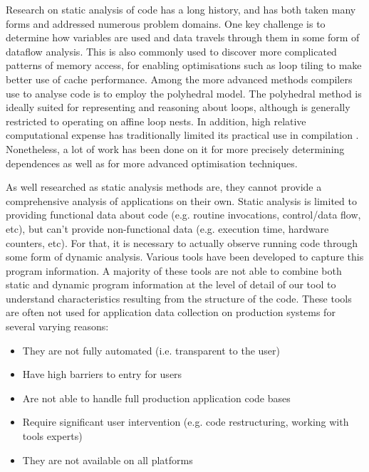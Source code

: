 Research on static analysis of code has a long history, and has both taken many forms and addressed numerous problem domains\cite{Andrade:2012:SAW:2355585.2355593}\cite{1194988}.
One key challenge is to determine how variables are used and data travels through them in some form of dataflow analysis\cite{Feautrier1991}.
This is also commonly used to discover more complicated patterns of memory access, for enabling optimisations such as loop tiling to make better use of cache performance.
Among the more advanced methods compilers use to analyse code is to employ the polyhedral model\cite{Cousot:1978:ADL:512760.512770}\cite{Bagnara:2009:APC:1628316.1628385}\cite{benabderrahmane.10.cc}.
The polyhedral method is ideally suited for representing and reasoning about loops, although is generally restricted to operating on affine loop nests. 
In addition, high relative computational expense has traditionally limited its practical use in compilation \cite{DBLP:journals/entcs/Simon10a}.
Nonetheless, a lot of work has been done on it for more precisely determining dependences \cite{Vasilache:2006:VDA:1183401.1183448} as well as for more advanced optimisation techniques\cite{Nieuwenhuizen2014AutovectorizationUP}\cite{5260526}.

As well researched as static analysis methods are, they cannot provide a comprehensive analysis of applications on their own.
Static analysis is limited to providing functional data about code (e.g. routine invocations, control/data flow, etc), but can't provide non-functional data (e.g. execution time, hardware counters, etc).
For that, it is necessary to actually observe running code through some form of dynamic analysis.
Various tools have been developed to capture this program information.
A majority of these tools are not able to combine both static and dynamic program information at the level of detail of our tool to understand characteristics resulting from the structure of the code.
These tools are often not used for application data collection on production systems for several varying reasons:
\begin{itemize}
\item They are not fully automated (i.e. transparent to the user)
\item Have high barriers to entry for users
\item Are not able to handle full production application code bases
\item Require significant user intervention (e.g. code restructuring, working with tools experts)
\item They are not available on all platforms
\end{itemize}

